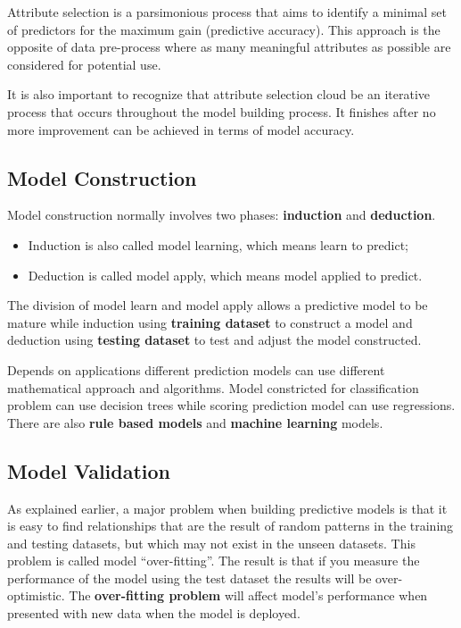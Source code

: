 \documentclass[
]{book}
\begin{document}
Attribute selection is a parsimonious process that aims to identify a minimal set of predictors for the maximum gain (predictive accuracy). This approach is the opposite of data pre-process where as many meaningful attributes as possible are considered for potential use.

It is also important to recognize that attribute selection cloud be an iterative process that occurs throughout the model building process. It finishes after no more improvement can be achieved in terms of model accuracy.

\hypertarget{model-construction}{%
\subsection*{Model Construction}\label{model-construction}}


Model construction normally involves two phases: \textbf{induction} and \textbf{deduction}.

\begin{itemize}
\item
  Induction is also called model learning, which means learn to predict;
\item
  Deduction is called model apply, which means model applied to predict.
\end{itemize}

The division of model learn and model apply allows a predictive model to be mature while induction using \textbf{training dataset} to construct a model and deduction using \textbf{testing dataset} to test and adjust the model constructed.

Depends on applications different prediction models can use different mathematical approach and algorithms. Model constricted for classification problem can use decision trees while scoring prediction model can use regressions. There are also \textbf{rule based models} and \textbf{machine learning} models.

\hypertarget{model-validation}{%
\subsection*{Model Validation}\label{model-validation}}


As explained earlier, a major problem when building predictive models is that it is easy to find relationships that are the result of random patterns in the training and testing datasets, but which may not exist in the unseen datasets. This problem is called model ``over-fitting''. The result is that if you measure the performance of the model using the test dataset the results will be over-optimistic. The \textbf{over-fitting problem} will affect model's performance when presented with new data when the model is deployed.
\end{document}
